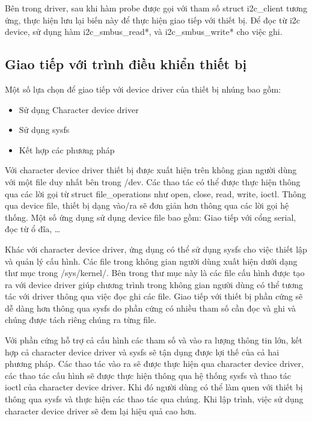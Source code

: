 \documentclass{report}
\begin{document}
Bên trong driver, sau khi hàm probe được gọi với tham số struct i2c\_client tương ứng, thực hiện lưu lại biến này để thực hiện giao tiếp với thiết bị. Để đọc từ i2c device, sử dụng hàm i2c\_smbus\_read*, và i2c\_smbus\_write* cho việc ghi.

\subsection{Giao tiếp với trình điều khiển thiết bị}

Một số lựa chọn để giao tiếp với device driver của thiết bị nhúng bao gồm:

\begin{itemize}
	\item Sử dụng Character device driver
	\item Sử dụng sysfs
	\item Kết hợp các phương pháp
\end{itemize}


Với character device driver thiết bị được xuất hiện trên không gian người dùng với một file duy nhất bên trong /dev. Các thao tác có thể được thực hiện thông qua các lời gọi từ struct file\_operations như open, close, read, write, ioctl. Thông qua device file, thiết bị dạng vào/ra sẽ đơn giản hơn thông qua các lời gọi hệ thống. Một số ứng dụng sử dụng device file bao gồm: Giao tiếp với cổng serial, đọc từ ổ đĩa, …

Khác với character device driver, ứng dụng có thể sử dụng sysfs cho việc thiết lập và quản lý cấu hình. Các file trong không gian người dùng xuất hiện dưới dạng thư mục trong /sys/kernel/. Bên trong thư mục này là các file cấu hình được tạo ra với device driver giúp chương trình trong không gian người dùng có thể tương tác với driver thông qua việc đọc ghi các file. Giao tiếp với thiết bị phần cứng sẽ dễ dàng hơn thông qua sysfs do phần cứng có nhiều tham số cần đọc và ghi và chúng được tách riêng chúng ra từng file.

Với phần cứng hỗ trợ cả cấu hình các tham số và vào ra lượng thông tin lớn, kết hợp cả character device driver và sysfs sẽ tận dụng được lợi thế của cả hai phương pháp. Các thao tác vào ra sẽ được thực hiện qua character device driver, các thao tác cấu hình sẽ được thực hiện thông qua hệ thống sysfs và thao tác ioctl của character device driver. Khi đó người dùng có thể làm quen với thiết bị thông qua sysfs và thực hiện các thao tác qua chúng. Khi lập trình, việc sử dụng character device driver sẽ đem lại hiệu quả cao hơn.
\end{document}
